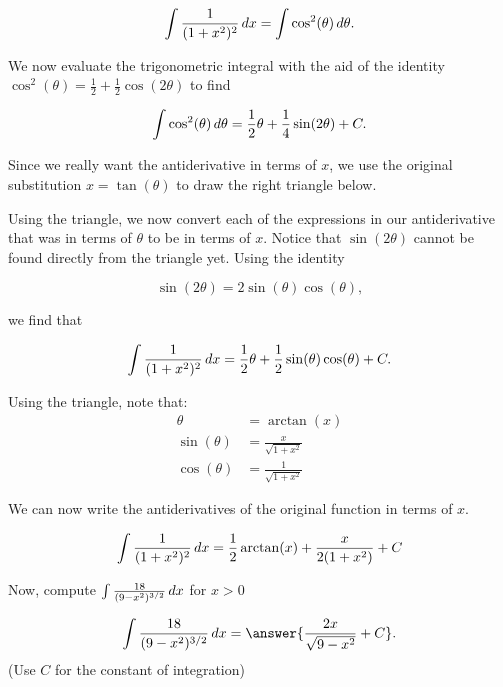 \documentclass{ximera}
\begin{document}
\begin{exercise}
\begin{example}
\begin{explanation}
\[
\int \frac{1}{(1+x^2)^2} \mathop{}\!d x  = \int \cos^2(\theta) \mathop{}\!d \theta.
\]

We now evaluate the trigonometric integral with the aid of the identity $\cos^{2}(\theta)=\frac{1}{2}+\frac{1}{2}\cos(2\theta)$ to find

\[
\int \cos^2(\theta) \mathop{}\!d \theta =  \frac{1}{2}\theta + \frac{1}{4}\sin(2\theta) + C .
\]

Since we really want the antiderivative in terms of $x$, we use the original substitution $x=\tan(\theta)$ to draw the right triangle below.

    \begin{image}
    \end{image}

Using the triangle, we now convert each of the expressions in our antiderivative that was in terms of $\theta$ to be in terms of $x$.  Notice that $\sin(2 \theta)$ cannot be found directly from the triangle yet.  Using the identity

\[
\sin(2\theta)=2\sin(\theta)\cos(\theta),
\]

we find that 

\[ \int \frac{1}{ (1+x^2)^2} \mathop{}\!d x = \frac{1}{2}\theta + \frac{1}{2} \sin(\theta) \cos(\theta) + C.\]  

Using the triangle, note that: 
\begin{align}
\theta&=\arctan(x) \\
\sin(\theta)&=\frac{x}{\sqrt{1+x^2}} \\
 \cos(\theta)&=\frac{1}{\sqrt{1+x^2}} 
\end{align}

We can now write the antiderivatives of the original function in terms of $x$.

\[
\int \frac{1}{ (1+x^2)^2} \mathop{}\!d x=\frac{1}{2}\arctan(x) + \frac{x}{2(1+x^{2})} + C 
\]
\end{explanation}
\end{example}

Now, compute $\int \frac{18}{(9-x^2)^{3/2}} \mathop{}\!d x$ for $x>0$

\[
\int \frac{18}{(9-x^2)^{3/2}} \d x = \answer{\frac{2x}{\sqrt{9-x^2}}+C}.
\]
(Use $C$ for the constant of integration)
\end{exercise}
\end{document}
